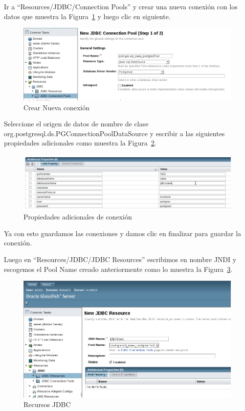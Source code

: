 Ir  a ``Resources/JDBC/Connection Pools'' y crear una nueva conexión con los datos que muestra la
Figura~\ref{figura:m1} y luego clic en siguiente.

\begin{figure}[!ht]
\begin{center}
\includegraphics[width=13cm]{pictures/m1.png}
\end{center}
\caption{Crear Nueva conexión} \label{figura:m1}
\end{figure}

Seleccione el origen de datos de nombre de clase org.postgresql.ds.PGConnectionPoolDataSource 
y escribir a las siguientes propiedades adicionales como muestra la Figura~\ref{figura:m2}.

\begin{figure}[!ht]
\begin{center}
\includegraphics[width=13cm]{pictures/m2.png}
\end{center}
\caption{Propiedades adicionales de conexión} \label{figura:m2}
\end{figure}

Ya con esto guardamos las conexiones y damos clic en finalizar para guardar la conexión.

Luego en ``Resources/JDBC/JDBC Resources'' escribimos en nombre JNDI y escogemos el Pool Name creado 
anteriormente como lo muestra la  Figura~\ref{figura:m3}.

\begin{figure}[!ht]
\begin{center}
\includegraphics[width=13cm]{pictures/m3.png}
\end{center}
\caption{Recursos JDBC} \label{figura:m3}
\end{figure}

